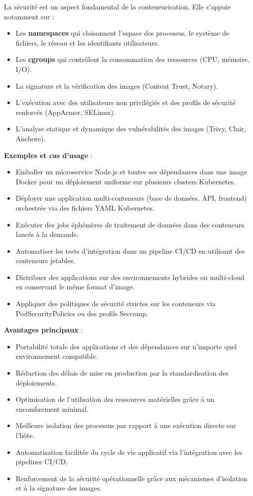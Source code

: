 La sécurité est un aspect fondamental de la conteneurisation. Elle s’appuie notamment sur :
\begin{itemize}
	\item Les \textbf{namespaces} qui cloisonnent l’espace des processus, le système de fichiers, le réseau et les identifiants utilisateurs.
	\item Les \textbf{cgroups} qui contrôlent la consommation des ressources (CPU, mémoire, I/O).
	\item La signature et la vérification des images (Content Trust, Notary).
	\item L’exécution avec des utilisateurs non privilégiés et des profils de sécurité renforcés (AppArmor, SELinux).
	\item L’analyse statique et dynamique des vulnérabilités des images (Trivy, Clair, Anchore).
\end{itemize}

\textbf{Exemples et cas d’usage} :
\begin{itemize}
	\item Emballer un microservice Node.js et toutes ses dépendances dans une image Docker pour un déploiement uniforme sur plusieurs clusters Kubernetes.
	\item Déployer une application multi-conteneurs (base de données, API, frontend) orchestrée via des fichiers YAML Kubernetes.
	\item Exécuter des jobs éphémères de traitement de données dans des conteneurs lancés à la demande.
	\item Automatiser les tests d’intégration dans un pipeline CI/CD en utilisant des conteneurs jetables.
	\item Distribuer des applications sur des environnements hybrides ou multi-cloud en conservant le même format d’image.
	\item Appliquer des politiques de sécurité strictes sur les conteneurs via PodSecurityPolicies ou des profils Seccomp.
\end{itemize}

\textbf{Avantages principaux} :
\begin{itemize}
	\item Portabilité totale des applications et des dépendances sur n’importe quel environnement compatible.
	\item Réduction des délais de mise en production par la standardisation des déploiements.
	\item Optimisation de l’utilisation des ressources matérielles grâce à un encombrement minimal.
	\item Meilleure isolation des processus par rapport à une exécution directe sur l’hôte.
	\item Automatisation facilitée du cycle de vie applicatif via l’intégration avec les pipelines CI/CD.
	\item Renforcement de la sécurité opérationnelle grâce aux mécanismes d’isolation et à la signature des images.
\end{itemize}

